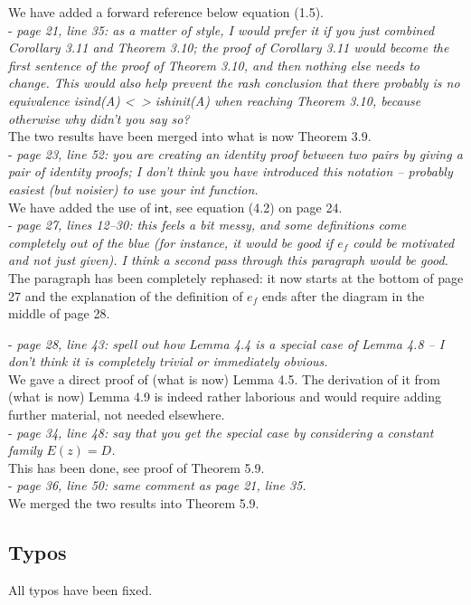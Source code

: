 \documentclass[11pt, oneside]{article}   	%
\begin{document}
We have added a forward reference below equation (1.5).  \\

- \emph{page 21, line 35: as a matter of style, I would prefer it if you just combined Corollary 3.11 and Theorem 3.10; the proof of Corollary 3.11 would become the first sentence of the proof of Theorem 3.10, and then nothing else needs to change. This would also help prevent the rash conclusion that there probably is no
 equivalence isind(A) <~> ishinit(A) when reaching Theorem 3.10, because otherwise why didn't you say so?} \\ 

The two results have been merged into what is now Theorem 3.9. \\

- \emph{page 23, line 52: you are creating an identity proof between two pairs by giving a pair of identity proofs; I don't think you have introduced this notation -- probably easiest (but noisier) to use your int function.} \\

We have added the use of $\mathsf{int}$, see equation (4.2) on page 24. \\

- \emph{page 27, lines 12--30: this feels a bit messy, and some definitions come completely out of the blue (for instance, it would be good if $e_f$ could be motivated and not just given). I think a second pass through this paragraph would be good.} \\

The paragraph has been completely rephased: it now starts at the bottom of page 27 and the explanation of the definition of $e_f$ ends after the diagram in the middle of page 28.

- \emph{page 28, line 43: spell out how Lemma 4.4 is a special case of Lemma 4.8 -- I don't think it is completely trivial or immediately obvious.} \\

We gave a direct proof of (what is now) Lemma 4.5. The derivation of it from (what is now) Lemma 4.9 is indeed rather laborious and would require adding further material, not needed elsewhere. \\

- \emph{page 34, line 48: say that you get the special case by considering a constant family $E(z) = D$.} \\ 

This has been done, see proof of Theorem 5.9. \\ 

- \emph{page 36, line 50: same comment as page 21, line 35.} \\

We merged the two results into Theorem 5.9. 


\subsection{Typos}

All typos have been fixed. 
\end{document}

